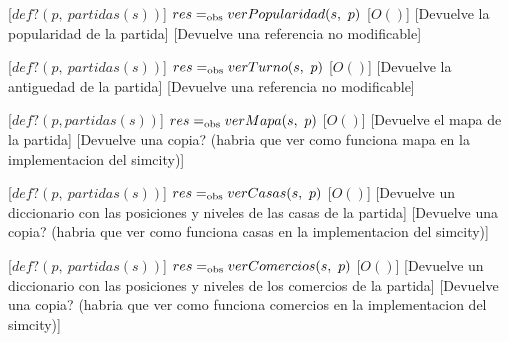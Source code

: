 \begin{Interfaz}
    [$def?(p,\ partidas(s))$]
    {$res \igobs verPopularidad(s,\ p)$}
    [$O()$]
    [Devuelve la popularidad de la partida]
    [Devuelve una referencia no modificable]

    [$def?(p,\ partidas(s))$]
    {$res \igobs verTurno(s,\ p)$}
    [$O()$]
    [Devuelve la antiguedad de la partida]
    [Devuelve una referencia no modificable]

    [$def?(p, partidas(s))$]
    {$res \igobs verMapa(s,\ p)$}
    [$O()$]
    [Devuelve el mapa de la partida]
    [Devuelve una copia? (habria que ver como funciona mapa en la implementacion del simcity)]

    [$def?(p,\ partidas(s))$]
    {$res \igobs verCasas(s,\ p)$}
    [$O()$]
    [Devuelve un diccionario con las posiciones y niveles de las casas de la partida]
    [Devuelve una copia? (habria que ver como funciona casas en la implementacion del simcity)]

    [$def?(p,\ partidas(s))$]
    {$res \igobs verComercios(s,\ p)$}
    [$O()$]
    [Devuelve un diccionario con las posiciones y niveles de los comercios de la partida]
    [Devuelve una copia? (habria que ver como funciona comercios en la implementacion del simcity)]

    \pagebreak


\end{Interfaz}
